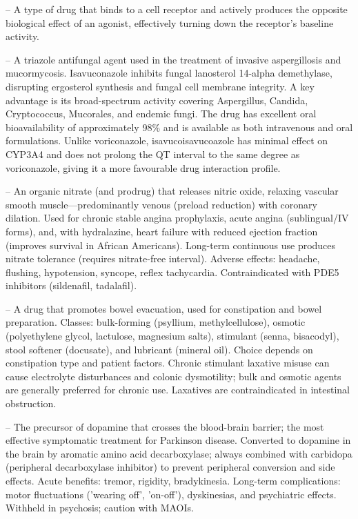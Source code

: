 -- A type of drug that binds to a cell receptor and actively produces the opposite biological effect of an agonist, effectively turning down the receptor's baseline activity.

-- A triazole antifungal agent used in the treatment of invasive aspergillosis and mucormycosis. Isavuconazole inhibits fungal lanosterol 14-alpha demethylase, disrupting ergosterol synthesis and fungal cell membrane integrity. A key advantage is its broad-spectrum activity covering Aspergillus, Candida, Cryptococcus, Mucorales, and endemic fungi. The drug has excellent oral bioavailability of approximately 98\% and is available as both intravenous and oral formulations. Unlike voriconazole, isavucoisavucoazole has minimal effect on CYP3A4 and does not prolong the QT interval to the same degree as voriconazole, giving it a more favourable drug interaction profile.

-- An organic nitrate (and prodrug) that releases nitric oxide, relaxing vascular smooth muscle—predominantly venous (preload reduction) with coronary dilation. Used for chronic stable angina prophylaxis, acute angina (sublingual/IV forms), and, with hydralazine, heart failure with reduced ejection fraction (improves survival in African Americans). Long-term continuous use produces nitrate tolerance (requires nitrate-free interval). Adverse effects: headache, flushing, hypotension, syncope, reflex tachycardia. Contraindicated with PDE5 inhibitors (sildenafil, tadalafil).

-- A drug that promotes bowel evacuation, used for constipation and bowel preparation. Classes: bulk-forming (psyllium, methylcellulose), osmotic (polyethylene glycol, lactulose, magnesium salts), stimulant (senna, bisacodyl), stool softener (docusate), and lubricant (mineral oil). Choice depends on constipation type and patient factors. Chronic stimulant laxative misuse can cause electrolyte disturbances and colonic dysmotility; bulk and osmotic agents are generally preferred for chronic use. Laxatives are contraindicated in intestinal obstruction.

-- The precursor of dopamine that crosses the blood-brain barrier; the most effective symptomatic treatment for Parkinson disease. Converted to dopamine in the brain by aromatic amino acid decarboxylase; always combined with carbidopa (peripheral decarboxylase inhibitor) to prevent peripheral conversion and side effects. Acute benefits: tremor, rigidity, bradykinesia. Long-term complications: motor fluctuations ('wearing off', 'on-off'), dyskinesias, and psychiatric effects. Withheld in psychosis; caution with MAOIs.

